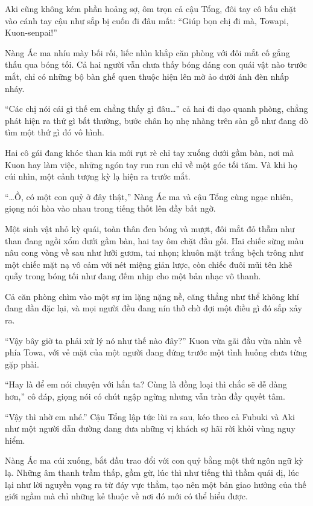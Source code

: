 \documentclass[../main.tex]{subfiles}
\begin{document}
Aki cũng không kém phần hoảng sợ, ôm trọn cả cậu Tổng, đôi tay cô bấu chặt vào cánh tay cậu như sắp bị cuốn đi đâu mất: ``Giúp bọn chị đi mà, Towapi, Kuon-senpai!''

Nàng Ác ma nhíu mày bối rối, liếc nhìn khắp căn phòng với đôi mắt cố gắng thấu qua bóng tối. Cả hai người vẫn chưa thấy bóng dáng con quái vật nào trước mắt, chỉ có những bộ bàn ghế quen thuộc hiện lên mờ ảo dưới ánh đèn nhấp nháy.

``Các chị nói cái gì thế em chẳng thấy gì đâu\dots'' cả hai đi dạo quanh phòng, chẳng phát hiện ra thứ gì bất thường, bước chân họ nhẹ nhàng trên sàn gỗ như đang dò tìm một thứ gì đó vô hình.

Hai cô gái đang khóc than kia mới rụt rè chỉ tay xuống dưới gầm bàn, nơi mà Kuon hay làm việc, những ngón tay run run chỉ về một góc tối tăm. Và khi họ cúi nhìn, một cảnh tượng kỳ lạ hiện ra trước mắt.

``\dots Ồ, có một con quỷ ở đây thật,'' Nàng Ác ma và cậu Tổng cùng ngạc nhiên, giọng nói hòa vào nhau trong tiếng thốt lên đầy bất ngờ.

Một sinh vật nhỏ kỳ quái, toàn thân đen bóng và mượt, đôi mắt đỏ thẫm như than đang ngồi xổm dưới gầm bàn, hai tay ôm chặt đầu gối. Hai chiếc sừng màu nâu cong vòng về sau như lưỡi gươm, tai nhọn; khuôn mặt trắng bệch trông như một chiếc mặt nạ vô cảm với nét miệng giản lược, còn chiếc đuôi mũi tên khẽ quẫy trong bóng tối như đang đếm nhịp cho một bản nhạc vô thanh.


Cả căn phòng chìm vào một sự im lặng nặng nề, căng thẳng như thể không khí đang dần đặc lại, và mọi người đều đang nín thở chờ đợi một điều gì đó sắp xảy ra.

``Vậy bây giờ ta phải xử lý nó như thế nào đây?'' Kuon vừa gãi đầu vừa nhìn về phía Towa, với vẻ mặt của một người đang đứng trước một tình huống chưa từng gặp phải.

``Hay là để em nói chuyện với hắn ta? Cùng là đồng loại thì chắc sẽ dễ dàng hơn,'' cô đáp, giọng nói có chút ngập ngừng nhưng vẫn tràn đầy quyết tâm.

``Vậy thì nhờ em nhé.'' Cậu Tổng lập tức lùi ra sau, kéo theo cả Fubuki và Aki như một người dẫn đường đang đưa những vị khách sợ hãi rời khỏi vùng nguy hiểm.

Nàng Ác ma cúi xuống, bắt đầu trao đổi với con quỷ bằng một thứ ngôn ngữ kỳ lạ. Những âm thanh trầm thấp, gầm gừ, lúc thì như tiếng thì thầm quái dị, lúc lại như lời nguyền vọng ra từ đáy vực thẳm, tạo nên một bản giao hưởng của thế giới ngầm mà chỉ những kẻ thuộc về nơi đó mới có thể hiểu được.
\end{document}
